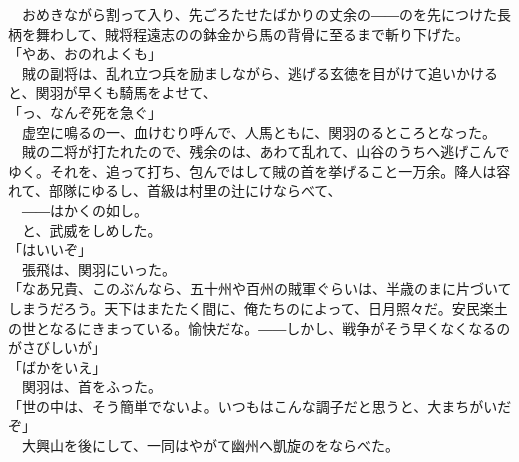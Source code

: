 \documentclass[
  paper=a5,
  fontsize=10pt,
  jafontsize=9.5pt,
  tate,                  %
  open_bracket_pos=nibu, %
]{jlreq}
\begin{document}
　おめきながら割って入り、先ごろたせたばかりの丈余の――のを先につけた長柄を舞わして、賊将程遠志のの鉢金から馬の背骨に至るまで斬り下げた。\\


「やあ、おのれよくも」\\


　賊の副将は、乱れ立つ兵を励ましながら、逃げる玄徳を目がけて追いかけると、関羽が早くも騎馬をよせて、\\


「っ、なんぞ死を急ぐ」\\


　虚空に鳴るの一、血けむり呼んで、人馬ともに、関羽のるところとなった。\\


　賊の二将が打たれたので、残余のは、あわて乱れて、山谷のうちへ逃げこんでゆく。それを、追って打ち、包んではして賊の首を挙げること一万余。降人は容れて、部隊にゆるし、首級は村里の辻にけならべて、\\


　――はかくの如し。\\


　と、武威をしめした。\\


「はいいぞ」\\


　張飛は、関羽にいった。\\


「なあ兄貴、このぶんなら、五十州や百州の賊軍ぐらいは、半歳のまに片づいてしまうだろう。天下はまたたく間に、俺たちのによって、日月照々だ。安民楽土の世となるにきまっている。愉快だな。――しかし、戦争がそう早くなくなるのがさびしいが」\\


「ばかをいえ」\\


　関羽は、首をふった。\\


「世の中は、そう簡単でないよ。いつもはこんな調子だと思うと、大まちがいだぞ」\\


　大興山を後にして、一同はやがて幽州へ凱旋のをならべた。\\
\end{document}
